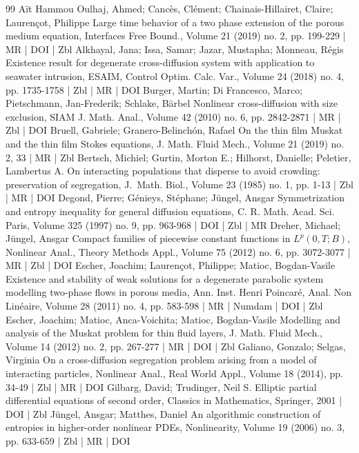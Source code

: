 \begin{thebibliography}{99}
Aït Hammou Oulhaj, Ahmed; Cancès, Clément; Chainais-Hillairet, Claire; Laurençot, Philippe Large time behavior of a two phase extension of the porous medium equation, Interfaces Free Bound., Volume 21 (2019) no. 2, pp. 199-229 | MR | DOI | Zbl
Alkhayal, Jana; Issa, Samar; Jazar, Mustapha; Monneau, Régis Existence result for degenerate cross-diffusion system with application to seawater intrusion, ESAIM, Control Optim. Calc. Var., Volume 24 (2018) no. 4, pp. 1735-1758 | Zbl | MR | DOI
Burger, Martin; Di Francesco, Marco; Pietschmann, Jan-Frederik; Schlake, Bärbel Nonlinear cross-diffusion with size exclusion, SIAM J. Math. Anal., Volume 42 (2010) no. 6, pp. 2842-2871 | MR | Zbl | DOI
Bruell, Gabriele; Granero-Belinchón, Rafael On the thin film Muskat and the thin film Stokes equations, J. Math. Fluid Mech., Volume 21 (2019) no. 2, 33 | MR | Zbl
Bertsch, Michiel; Gurtin, Morton E.; Hilhorst, Danielle; Peletier, Lambertus A. On interacting populations that disperse to avoid crowding: preservation of segregation, J. Math. Biol., Volume 23 (1985) no. 1, pp. 1-13 | Zbl | MR | DOI
Degond, Pierre; Génieys, Stéphane; Jüngel, Ansgar Symmetrization and entropy inequality for general diffusion equations, C. R. Math. Acad. Sci. Paris, Volume 325 (1997) no. 9, pp. 963-968 | DOI | Zbl | MR
Dreher, Michael; Jüngel, Ansgar Compact families of piecewise constant functions in ${L}^p (0,{T};{B})$, Nonlinear Anal., Theory Methods Appl., Volume 75 (2012) no. 6, pp. 3072-3077 | MR | Zbl | DOI
Escher, Joachim; Laurençot, Philippe; Matioc, Bogdan-Vasile Existence and stability of weak solutions for a degenerate parabolic system modelling two-phase flows in porous media, Ann. Inst. Henri Poincaré, Anal. Non Linéaire, Volume 28 (2011) no. 4, pp. 583-598 | MR | Numdam | DOI | Zbl
Escher, Joachim; Matioc, Anca-Voichita; Matioc, Bogdan-Vasile Modelling and analysis of the Muskat problem for thin fluid layers, J. Math. Fluid Mech., Volume 14 (2012) no. 2, pp. 267-277 | MR | DOI | Zbl
Galiano, Gonzalo; Selgas, Virginia On a cross-diffusion segregation problem arising from a model of interacting particles, Nonlinear Anal., Real World Appl., Volume 18 (2014), pp. 34-49 | Zbl | MR | DOI
Gilbarg, David; Trudinger, Neil S. Elliptic partial differential equations of second order, Classics in Mathematics, Springer, 2001 | DOI | Zbl
Jüngel, Ansgar; Matthes, Daniel An algorithmic construction of entropies in higher-order nonlinear PDEs, Nonlinearity, Volume 19 (2006) no. 3, pp. 633-659 | Zbl | MR | DOI

\end{thebibliography}

